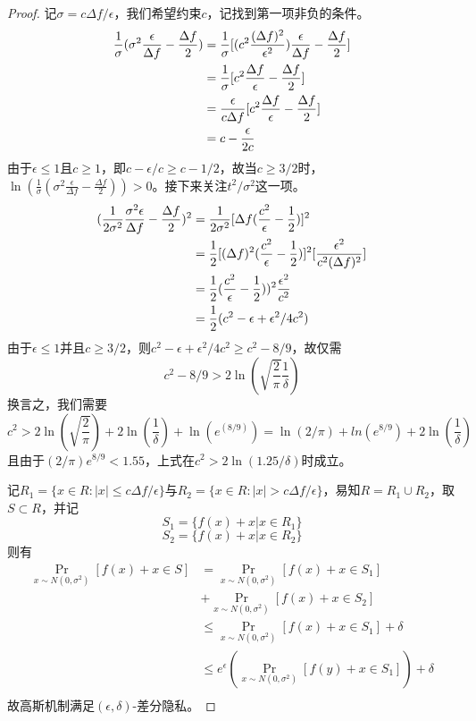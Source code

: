 \begin{proof}
	记$\sigma=c\Delta f/\epsilon$，我们希望约束$c$，记找到第一项非负的条件。
	\begin{equation}
		\begin{aligned}
			\frac{1}{\sigma}(\sigma^2\frac{\epsilon}{\Delta f}-\frac{\Delta f}{2})
			& = \frac{1}{\sigma}[(c^2\frac{(\Delta f)^2}{\epsilon^2})\frac{\epsilon}{\Delta f}-\frac{\Delta f}{2}]\\
			& = \frac{1}{\sigma}[c^2\frac{\Delta f}{\epsilon}-\frac{\Delta f}{2}]\\
			& = \frac{\epsilon}{c\Delta f}[c^2\frac{\Delta f}{\epsilon}-\frac{\Delta f}{2}]\\
			& = c-\frac{\epsilon}{2c}\notag\\ 
		\end{aligned}
	\end{equation}
	由于$\epsilon\leq 1$且$c\geq 1$，即$c-\epsilon/c\geq c - 1/2$，故当$c\geq 3/2$时，$\ln(\frac{1}{\sigma}(\sigma^2\frac{\epsilon}{\Delta f}-\frac{\Delta f}{2}))>0$。接下来关注$t^2/\sigma^2$这一项。
	\begin{equation}
		\begin{aligned}
			(\frac{1}{2\sigma^2}\frac{\sigma^2\epsilon}{\Delta f}-\frac{\Delta f}{2})^2
			& = \frac{1}{2\sigma^2}[\Delta f(\frac{c^2}{\epsilon}-\frac{1}{2})]^2\\
			& = \frac{1}{2}[(\Delta f)^2(\frac{c^2}{\epsilon}-\frac{1}{2})]^2[\frac{\epsilon^2}{c^2(\Delta f)^2}]\\
			& = \frac{1}{2}(\frac{c^2}{\epsilon}-\frac{1}{2}))^2\frac{\epsilon^2}{c^2}\\
			& = \frac{1}{2}(c^2-\epsilon+\epsilon^2/4c^2)\notag\\ 
		\end{aligned}
	\end{equation}
	由于$\epsilon\leq 1$并且$c\geq 3/2$，则$c^2-\epsilon+\epsilon^2/4c^2\geq c^2-8/9$，故仅需
	$$c^2-8/9>2\ln(\sqrt{\frac{2}{\pi}}\frac{1}{\delta})$$
	换言之，我们需要
	$$c^2>2\ln(\sqrt{\frac{2}{\pi}})+2\ln(\frac{1}{\delta})+\ln(e^(8/9))=\ln(2/\pi)+ln(e^{8/9})+2\ln(\frac{1}{\delta})$$
	且由于$(2/\pi)e^{8/9}<1.55$，上式在$c^2>2\ln(1.25/\delta)$时成立。
	
	记$R_1=\{x\in R:|x|\leq c\Delta f/\epsilon\}$与$R_2=\{x\in R:|x|> c\Delta f/\epsilon\}$，易知$R=R_1\cup R_2$，取$S\subset R$，并记
	$$S_1=\{f(x)+x|x\in R_1\}$$
	$$S_2=\{f(x)+x|x\in R_2\}$$
	则有
	\begin{equation}
		\begin{aligned}
			\mathop{Pr}\limits_{x\sim N(0,\sigma^2)}[f(x)+x\in S]
			& = \mathop{Pr}\limits_{x\sim N(0,\sigma^2)}[f(x)+x\in S_1]\\
			& + \mathop{Pr}\limits_{x\sim N(0,\sigma^2)}[f(x)+x\in S_2]\\
			& \leq \mathop{Pr}\limits_{x\sim N(0,\sigma^2)}[f(x)+x\in S_1] + \delta\\
			& \leq e^\epsilon(\mathop{Pr}\limits_{x\sim N(0,\sigma^2)}[f(y)+x\in S_1]) + \delta\\
		\end{aligned}
	\end{equation}
	故高斯机制满足$(\epsilon,\delta)$-差分隐私。
	
\end{proof}

